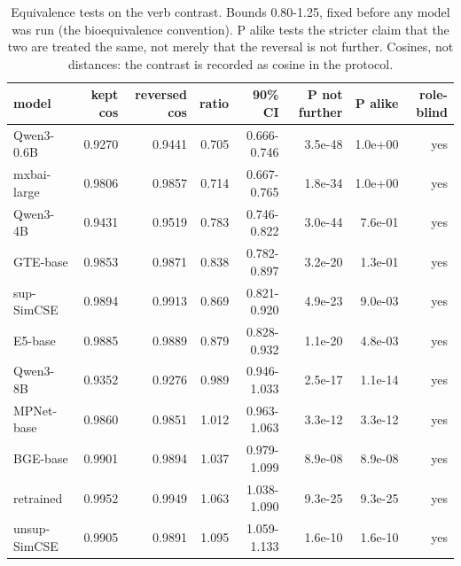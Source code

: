 \begin{table}[t]
\centering
\small
\caption{Equivalence tests on the verb contrast. Bounds 0.80-1.25, fixed before any model was run (the bioequivalence convention). P alike tests the stricter claim that the two are treated the same, not merely that the reversal is not further. Cosines, not distances: the contrast is recorded as cosine in the protocol.}
\begin{tabular}{lrrrrrrr}
\toprule
model & kept cos & reversed cos & ratio & 90\% CI & P not further & P alike & role-blind \\
\midrule
Qwen3-0.6B & 0.9270 & 0.9441 & 0.705 & 0.666-0.746 & 3.5e-48 & 1.0e+00 & yes \\
mxbai-large & 0.9806 & 0.9857 & 0.714 & 0.667-0.765 & 1.8e-34 & 1.0e+00 & yes \\
Qwen3-4B & 0.9431 & 0.9519 & 0.783 & 0.746-0.822 & 3.0e-44 & 7.6e-01 & yes \\
GTE-base & 0.9853 & 0.9871 & 0.838 & 0.782-0.897 & 3.2e-20 & 1.3e-01 & yes \\
sup-SimCSE & 0.9894 & 0.9913 & 0.869 & 0.821-0.920 & 4.9e-23 & 9.0e-03 & yes \\
E5-base & 0.9885 & 0.9889 & 0.879 & 0.828-0.932 & 1.1e-20 & 4.8e-03 & yes \\
Qwen3-8B & 0.9352 & 0.9276 & 0.989 & 0.946-1.033 & 2.5e-17 & 1.1e-14 & yes \\
MPNet-base & 0.9860 & 0.9851 & 1.012 & 0.963-1.063 & 3.3e-12 & 3.3e-12 & yes \\
BGE-base & 0.9901 & 0.9894 & 1.037 & 0.979-1.099 & 8.9e-08 & 8.9e-08 & yes \\
retrained & 0.9952 & 0.9949 & 1.063 & 1.038-1.090 & 9.3e-25 & 9.3e-25 & yes \\
unsup-SimCSE & 0.9905 & 0.9891 & 1.095 & 1.059-1.133 & 1.6e-10 & 1.6e-10 & yes \\
\bottomrule
\end{tabular}
\end{table}
